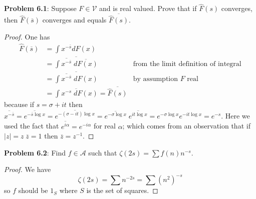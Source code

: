 \documentclass[12pt]{article}
\newcommand{\V}{\mathcal{V}}
\newcommand{\A}{\mathcal{A}}
\newcommand{\Fhat}{\widehat{F}}
\newcommand{\cconj}[1]{\overline{#1}}
\begin{document}
\fi

\textbf{Problem 6.1}: Suppose $F \in \V$ and is real valued. Prove that if $\Fhat(s)$ converges, then $\Fhat(\cconj{s})$ converges and equals $\cconj{\Fhat(s)}$.

\begin{proof}
\newcommand{\sbar}{\cconj{s}}
One has
\begin{align*}
\Fhat(\cconj{s}) &= \int x^{-\sbar} dF(x)\\
&= \cconj{\int \cconj{x^{-\sbar}} \; \cconj{dF(x)}} &\text{from the limit definition of integral}\\
&= \cconj{\int \cconj{x^{-\sbar}} \; dF(x)} &\text{by assumption } F \text{ real}\\
&= \cconj{\int x^{-s} \; dF(x)} = \cconj{\Fhat(s)}
\end{align*}
because if $s = \sigma + it$ then $\cconj{x^{-\sbar}} = \cconj{e^{-\sbar \log x}} = \cconj{e^{-(\sigma - i t) \log x}} = \cconj{e^{-\sigma \log x}} \; \cconj{e^{i t \log x}} = e^{-\sigma \log x} e^{- i t \log x} = e^{-s}$. Here we used the fact that $\cconj{e^{i\alpha}} = e^{-i\alpha}$ for real $\alpha$; which comes from an observation that if $|z| = z \; \cconj{z}= 1$ then $\cconj{z} = z^{-1}$.
\end{proof}

\textbf{Problem 6.2}: Find $f \in \A$ such that $\zeta(2s) = \sum f(n)n^{-s}$.

\begin{proof}
We have
$$\zeta(2s) = \sum n^{-2s} = \sum (n^2)^{-s}$$
so $f$ should be $1_S$ where $S$ is the set of squares.
\end{proof}

\unless\ifdefined\IsMainDocument
\end{document}
